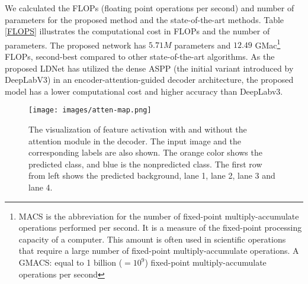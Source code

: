 \documentclass[journal]{IEEEtran}
\begin{document}
 We calculated the FLOPs (floating point operations per second) and number of parameters for the proposed method and the state-of-the-art methods. Table \ref{FLOPS} illustrates the computational cost in FLOPs and the number of parameters.  The proposed network has $5.71M$ parameters and $12.49$ GMac\footnote{MACS is the abbreviation for the number of fixed-point multiply-accumulate operations performed per second. It is a measure of the fixed-point processing capacity of a computer. This amount is often used in scientific operations that require a large number of fixed-point multiply-accumulate operations.
A GMACS: equal to 1 billion ($=10 ^ 9$) fixed-point multiply-accumulate operations per second} FLOPs, second-best compared to other state-of-the-art algorithms. As the proposed LDNet has utilized the dense ASPP (the initial variant introduced by DeepLabV3) in an encoder-attention-guided decoder architecture, the proposed model has a lower computational cost and higher accuracy than DeepLabv3. 
\begin{table}[h]
\centering
\caption{Comparison of the computational costs of the proposed LDNet and other state-of-the-art methods in terms of FLOPs and number of parameters.}
\label{FLOPS}
\end{table}
\begin{figure}[t]
      \centering
      \texttt{[image: images/atten-map.png]}
\caption{The visualization of feature activation with and without the attention module in the decoder. The input image and the corresponding labels are also shown. The orange color shows the predicted class, and blue is the nonpredicted class. The first row from left shows the predicted background, lane 1, lane 2, lane 3 and lane 4. }
      \label{atten-map}
\end{figure}
\end{document}
